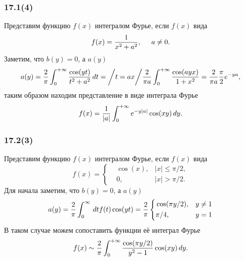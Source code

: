 \subsubsection*{17.1(4)}

Представим функцию $f(x)$ интегралом Фурье, если $f(x)$ вида
\begin{equation*}
    f(x)  = \frac{1}{x^2 + a^2}, \hspace{5 mm} a \neq 0.
\end{equation*}
Заметим, что $b(y) = 0$, а $a(y)$ 
\begin{equation*}
    a(y) = \frac{2}{\pi}\int_0^{+\infty} \frac{\cos (yt)}{t^2 + a^2} \, d t = 
    \bigg/
        t = a x
    \bigg/ \frac{2}{\pi a} \int_0^{+\infty} \frac{\cos (a y x)}{1 + x^2} = \frac{2}{\pi a} \frac{\pi}{2}
    e^{-y a},
\end{equation*}
таким образом находим представление в виде интеграла Фурье
\begin{equation*}
    f(x) = \frac{1}{|a|} \int_0^{+\infty} e^{- y |a|} \cos (xy) \, d y.
\end{equation*}





\subsubsection*{17.2(3)}

Представим функцию $f(x)$ интегралом Фурье, если $f(x)$ вида
\begin{equation*}
    f(x) = \left\{\begin{aligned}
        &\cos(x),  &|x| \leq \pi/2, \\
        &0, &|x| > \pi/2.
    \end{aligned}\right.
\end{equation*}
Для начала заметим, что $b(y) = 0$, а $a(y)$ 
\begin{equation*}
     a(y) = \frac{2}{\pi} \int_0^{\infty} \, d t f(t) \cos (y t) = \frac{2}{\pi} \left\{\begin{aligned}
         &\cos (\pi y/2), &y\neq 1\\
         &\pi/4, &y=1\\
     \end{aligned}\right.
 \end{equation*} 
 В таком случае можем сопоставить функции её интеграл Фурье
 \begin{equation*}
     f(x) \sim \frac{2}{\pi} \int_0^{+\infty} \frac{\cos (\pi y /2)}{y^2-1} \cos (xy) \, d y.
 \end{equation*}



